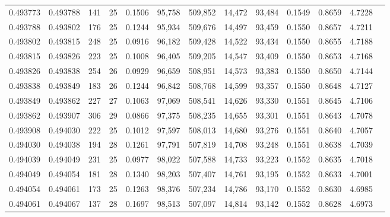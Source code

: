 \begin{tabular}{rrrrrrrrrrrrr}
0.493773 & 0.493788 & 141 &  25 &                                     0.1506 &  95,758 & 509,852 &  14,472 &  93,484 & 0.1549 & 0.8659 & 4.7228 \\
0.493788 & 0.493802 & 176 &  25 &                                     0.1244 &  95,934 & 509,676 &  14,497 &  93,459 & 0.1550 & 0.8657 & 4.7211 \\
0.493802 & 0.493815 & 248 &  25 &                                     0.0916 &  96,182 & 509,428 &  14,522 &  93,434 & 0.1550 & 0.8655 & 4.7188 \\
0.493815 & 0.493826 & 223 &  25 &                                     0.1008 &  96,405 & 509,205 &  14,547 &  93,409 & 0.1550 & 0.8653 & 4.7168 \\
0.493826 & 0.493838 & 254 &  26 &                                     0.0929 &  96,659 & 508,951 &  14,573 &  93,383 & 0.1550 & 0.8650 & 4.7144 \\
0.493838 & 0.493849 & 183 &  26 &                                     0.1244 &  96,842 & 508,768 &  14,599 &  93,357 & 0.1550 & 0.8648 & 4.7127 \\
0.493849 & 0.493862 & 227 &  27 &                                     0.1063 &  97,069 & 508,541 &  14,626 &  93,330 & 0.1551 & 0.8645 & 4.7106 \\
0.493862 & 0.493907 & 306 &  29 &                                     0.0866 &  97,375 & 508,235 &  14,655 &  93,301 & 0.1551 & 0.8643 & 4.7078 \\
0.493908 & 0.494030 & 222 &  25 &                                     0.1012 &  97,597 & 508,013 &  14,680 &  93,276 & 0.1551 & 0.8640 & 4.7057 \\
0.494030 & 0.494038 & 194 &  28 &                                     0.1261 &  97,791 & 507,819 &  14,708 &  93,248 & 0.1551 & 0.8638 & 4.7039 \\
0.494039 & 0.494049 & 231 &  25 &                                     0.0977 &  98,022 & 507,588 &  14,733 &  93,223 & 0.1552 & 0.8635 & 4.7018 \\
0.494049 & 0.494054 & 181 &  28 &                                     0.1340 &  98,203 & 507,407 &  14,761 &  93,195 & 0.1552 & 0.8633 & 4.7001 \\
0.494054 & 0.494061 & 173 &  25 &                                     0.1263 &  98,376 & 507,234 &  14,786 &  93,170 & 0.1552 & 0.8630 & 4.6985 \\
0.494061 & 0.494067 & 137 &  28 &                                     0.1697 &  98,513 & 507,097 &  14,814 &  93,142 & 0.1552 & 0.8628 & 4.6973 \\

\end{tabular}
